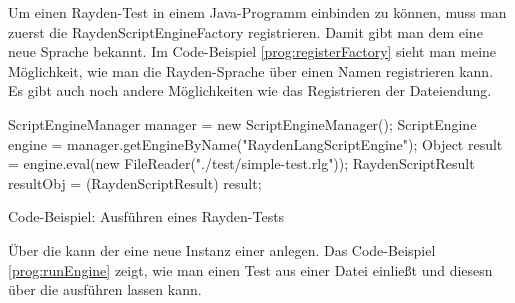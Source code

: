 \SuperPar
Um einen Rayden-Test in einem Java-Programm einbinden zu können, muss man zuerst die RaydenScriptEngineFactory registrieren. Damit gibt man dem  eine neue Sprache bekannt. Im Code-Beispiel \ref{prog:registerFactory} sieht man meine Möglichkeit, wie man die Rayden-Sprache über einen Namen registrieren kann. Es gibt auch noch andere Möglichkeiten wie das Registrieren der Dateiendung.

\begin{program}
\begin{JavaCode}
ScriptEngineManager manager = new ScriptEngineManager();
ScriptEngine engine = manager.getEngineByName("RaydenLangScriptEngine");
Object result =  engine.eval(new FileReader("./test/simple-test.rlg"));
RaydenScriptResult resultObj = (RaydenScriptResult) result;
\end{JavaCode}
\caption{Code-Beispiel: Ausführen eines Rayden-Tests}
\label{prog:runEngine}
\end{program}

\SuperPar
Über die  kann der  eine neue Instanz einer  anlegen. Das Code-Beispiel \ref{prog:runEngine} zeigt, wie man einen Test aus einer Datei einließt und diesesn über die  ausführen lassen kann.


